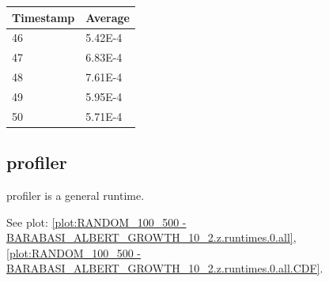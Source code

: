 \begin{tabular}{|l||l|}
\hline
	\textbf{Timestamp} & \textbf{Average} \\ \hline
	46 & 5.42E-4 \\ \hline
	47 & 6.83E-4 \\ \hline
	48 & 7.61E-4 \\ \hline
	49 & 5.95E-4 \\ \hline
	50 & 5.71E-4 \\ \hline
\end{tabular}

\subsection{profiler}
profiler is a general runtime.

See plot: \ref{plot:RANDOM_100_500 - BARABASI_ALBERT_GROWTH_10_2.z.runtimes.0.all}, \ref{plot:RANDOM_100_500 - BARABASI_ALBERT_GROWTH_10_2.z.runtimes.0.all.CDF}.

